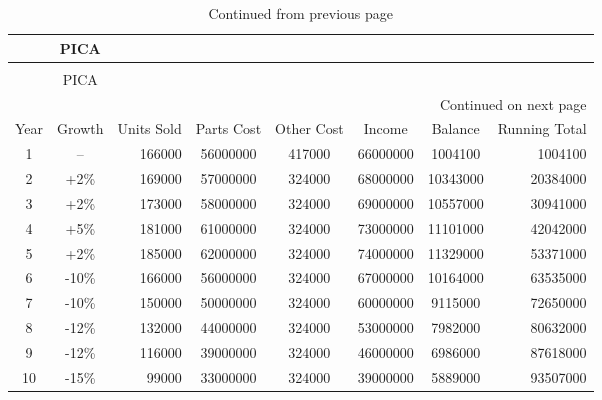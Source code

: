 {
\small
\begin{longtable}[c]{|c|c|r|c|c|c|c|r|}
\caption{Ten-Year Financial Forecast\label{ten_year_forecast.tex}}\\
\hline
\rowcolor{blue}
 & PICA &  &  &  &  &  & \\
\hline
\endfirsthead

\caption[]{Continued from previous page}\\
\hline
\rowcolor{blue}
 & PICA &  &  &  &  &  &  \\
\hline
\endhead

\multicolumn{8}{r}{{Continued on next page}} \\
\endfoot

\endlastfoot

Year & Growth & Units Sold & Parts Cost & Other Cost & Income & Balance & Running Total \\ \hline\hline
1 & -- & 166000 & 56000000 & 417000 & 66000000 & 1004100 & 1004100 \\
2 & +2\% & 169000 & 57000000 & 324000 & 68000000 & 10343000 & 20384000 \\
3 & +2\% & 173000 & 58000000 & 324000 & 69000000 & 10557000 & 30941000 \\
4 & +5\% & 181000 & 61000000 & 324000 & 73000000 & 11101000 & 42042000 \\
5 & +2\% & 185000 & 62000000 & 324000 & 74000000 & 11329000 & 53371000 \\
6 & -10\% & 166000 & 56000000 & 324000 & 67000000 & 10164000 & 63535000 \\
7 & -10\% & 150000 & 50000000 & 324000 & 60000000 & 9115000& 72650000 \\
8 & -12\% & 132000 & 44000000 & 324000 & 53000000 & 7982000 & 80632000 \\
9 & -12\% & 116000 & 39000000 & 324000 & 46000000 & 6986000 & 87618000 \\
10 & -15\% & 99000 & 33000000 & 324000 & 39000000 & 5889000 & 93507000 \\
\hline
\end{longtable}
}